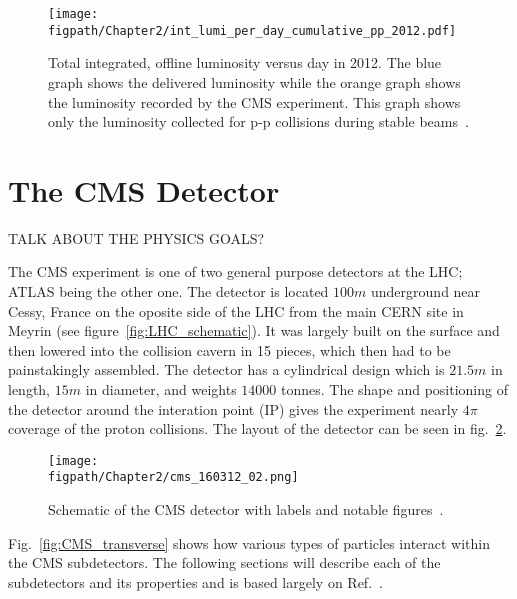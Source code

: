 \begin{figure}[!hbt]
	\centering
	\texttt{[image: \\figpath/Chapter2/int\_lumi\_per\_day\_cumulative\_pp\_2012.pdf]}
	\caption{Total integrated, offline luminosity versus day in 2012. The blue graph shows the delivered luminosity while the orange graph shows the luminosity recorded by the CMS experiment. This graph shows only the luminosity collected for p-p collisions during stable beams~\cite{LumiPublic}.}
	\label{fig:LHC_lumi_per_day_pp}
\end{figure}


\section{The CMS Detector}

TALK ABOUT THE PHYSICS GOALS?

The CMS experiment is one of two general purpose detectors at the LHC; ATLAS being the other one. The detector is located $100\unit{m}$ underground near Cessy, France on the oposite side of the LHC from the main CERN site in Meyrin (see figure~\ref{fig:LHC_schematic}). It was largely built on the surface and then lowered into the collision cavern in 15 pieces, which then had to be painstakingly assembled. The detector has a cylindrical design which is $21.5\unit{m}$ in length, $15\unit{m}$ in diameter, and weights $14000$ tonnes. The shape and positioning of the detector around the interation point (IP) gives the experiment nearly $4\pi$ coverage of the proton collisions. The layout of the detector can be seen in fig.~\ref{fig:CMS_schematic}.

\begin{figure}[!hbt]
	\centering
	\texttt{[image: \\figpath/Chapter2/cms\_160312\_02.png]}
	\caption{Schematic of the CMS detector with labels and notable figures~\cite{SketchUpCMS}.}
	\label{fig:CMS_schematic}
\end{figure}

Fig.~\ref{fig:CMS_transverse} shows how various types of particles interact within the CMS subdetectors. The following sections will describe each of the subdetectors and its properties and is based largely on Ref.~\cite{Chatrchyan:2008aa}.

